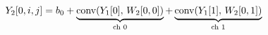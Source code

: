 \documentclass[preview]{standalone}
\begin{document}
\begin{align*}
\special{dvisvgm:raw <g id='unique000'>}Y_2[0,i,j]=b_0+\underbrace{\text{conv}(Y_1[0],\,W_2[0,0])}_{\text{ch 0}}+\underbrace{\text{conv}(Y_1[1],\,W_2[0,1])}_{\text{ch 1}}\special{dvisvgm:raw </g>}
\end{align*}
\end{document}

